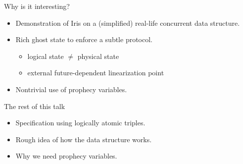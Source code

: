 \begin{frame}{Why is it interesting?}
\begin{itemize}
	\setlength\itemsep{1em}
	\item Demonstration of Iris on a (simplified) real-life concurrent data structure.
	\item Rich ghost state to enforce a subtle protocol.
		\begin{itemize}
			\item logical state $\neq$ physical state
			\item external future-dependent linearization point
		\end{itemize}
	\item Nontrivial use of prophecy variables.
\end{itemize}
\end{frame}

\begin{frame}{The rest of this talk}
\begin{itemize}
	\item Specification using logically atomic triples.
	\item Rough idea of how the data structure works.
	\item Why we need prophecy variables.
\end{itemize}
\end{frame}